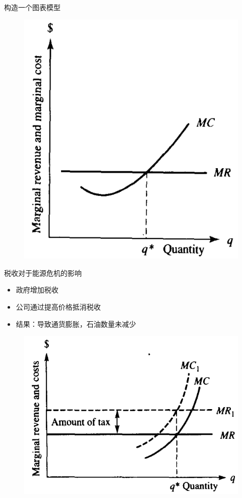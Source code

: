 \documentclass[UTF8]{ctexbeamer}
\begin{document}
\begin{frame}{构造一个图表模型}
\begin{figure}
    \includegraphics[height=.35\textheight]{mcr.png}
  \end{figure}

\end{frame}

\begin{frame}{税收对于能源危机的影响}
  \begin{itemize}
  \item 政府增加税收
  \item 公司通过提高价格抵消税收
  \item 结果：导致通货膨胀，石油数量未减少
  \end{itemize}

  \begin{figure}
    \centering
    \includegraphics[width=.5\textwidth]{taxshift.png}
  \end{figure}

\end{frame}
\end{document}

